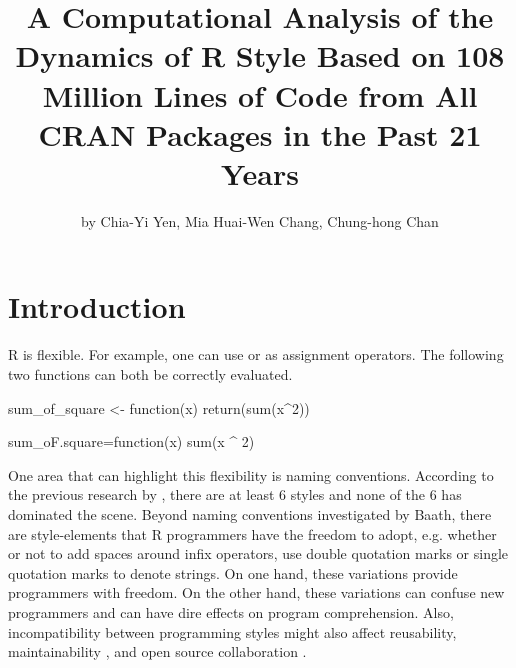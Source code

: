 \title{A Computational Analysis of the Dynamics of R Style Based on 108 Million Lines of Code from All CRAN Packages in the Past 21 Years}
\author{by Chia-Yi Yen, Mia Huai-Wen Chang, Chung-hong Chan}

\maketitle


\section{Introduction}

R is flexible. For example, one can use \code{<-} or \code{=} as assignment operators. The following two functions can both be correctly evaluated.

\begin{example}
sum_of_square <- function(x) {
    return(sum(x^2))
}
\end{example}

\begin{example}
sum_oF.square=function(x)
{
    sum(x ^ 2)}
\end{example}

One area that can highlight this flexibility is naming conventions. According to the previous research by \citet{baaaath}, there are at least 6 styles and none of the 6 has dominated the scene. Beyond naming conventions investigated by Baath, there are style-elements that R programmers have the freedom to adopt, e.g. whether or not to add spaces around infix operators, use double quotation marks or single quotation marks to denote strings. On one hand, these variations provide programmers with freedom. On the other hand, these variations can confuse new programmers and can have dire effects on program comprehension. Also, incompatibility between programming styles might also affect reusability, maintainability \citep{elish}, and open source collaboration \citep{wang}. 

